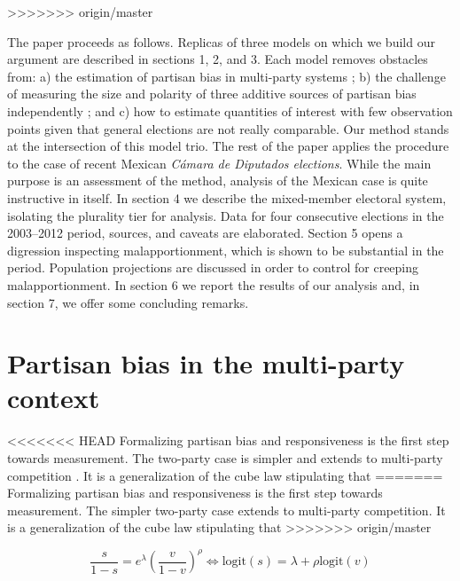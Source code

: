 \documentclass[letter,12pt]{article}
\begin{document}
>>>>>>> origin/master

The paper proceeds as follows. Replicas of three models on which we build our argument are described in sections 1, 2, and 3. Each model removes obstacles from: a) the estimation of partisan bias in multi-party systems ; b) the challenge of measuring the size and polarity of three additive sources of partisan bias independently ; and c) how to estimate quantities of interest with few observation points given that general elections are not really comparable. Our method stands at the intersection of this model trio. The rest of the paper applies the procedure to the case of recent Mexican \emph{C\'amara de Diputados elections}. While the main purpose is an assessment of the method, analysis of the Mexican case is quite instructive in itself. In section 4 we describe the mixed-member electoral system, isolating the plurality tier for analysis. Data for four consecutive elections in the 2003--2012 period, sources, and caveats are elaborated. Section 5 opens a digression inspecting malapportionment, which is shown to be substantial in the period. Population projections are discussed in order to control for creeping malapportionment. In section 6 we report the results of our analysis and, in section 7, we offer some concluding remarks. 

\section{Partisan bias in the multi-party context}

<<<<<<< HEAD
Formalizing partisan bias and responsiveness is the first step towards measurement. The two-party case is simpler and extends to multi-party competition \citep{taagepera.CubeLaw.1973,tufte1973seatsVotes,king.browning1987biasRespUS}. It is a generalization of the cube law stipulating that 
=======
Formalizing partisan bias and responsiveness is the first step towards measurement. The simpler two-party case \citep{taagepera.CubeLaw.1973,tufte1973seatsVotes,king.browning1987biasRespUS} extends to multi-party competition. It is a generalization of the cube law stipulating that 
>>>>>>> origin/master

\begin{equation}\label{E:kingBi}
 \frac{s}{1-s} = e^\lambda  \left(\frac{v}{1-v}\right)^\rho \iff
 \text{logit}(s) = \lambda + \rho  \text{logit}(v)
\end{equation}\label{E:cubeLaw}
\end{document}
